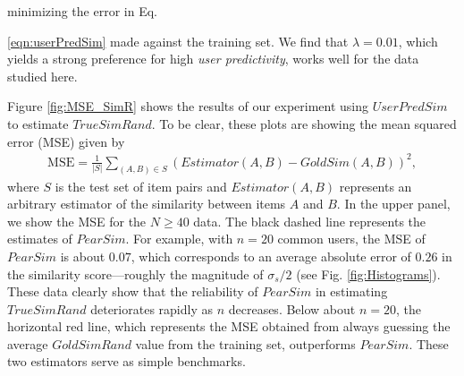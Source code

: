 \documentclass[11pt]{article}
\begin{document}
minimizing the error in Eq. {\ref{eqn:userPredSim} made against the training
set. We find that $\lambda = 0.01$, which yields a strong preference for high
{\em user predictivity}, works well for the data studied here.

Figure \ref{fig:MSE_SimR} shows the results of our experiment using
$UserPredSim$ to estimate $TrueSimRand$. To be clear, these plots are showing
the mean squared error (MSE) given by
\begin{align}
\mathrm{MSE} = \frac{1}{\left|S\right|}\sum_{(A,B) \in S}
{\left(Estimator(A,B) - GoldSim(A,B)\right)^2},
\end{align}
where $S$ is the test set of item pairs and $Estimator(A, B)$ represents an
arbitrary estimator of the similarity between items $A$ and $B$. In the upper
panel, we show the MSE for the $N \geq 40$ data. The black dashed line
represents the estimates of $PearSim$. For example, with $n = 20$ common users,
the MSE of $PearSim$ is about $0.07$, which corresponds to an average absolute
error of $0.26$ in the similarity score---roughly the magnitude of $\sigma_s/2$
(see Fig. \ref{fig:Histograms}). These data clearly show that the reliability of
$PearSim$ in estimating $TrueSimRand$ deteriorates rapidly as $n$ decreases.
Below about $n = 20$, the horizontal red line, which represents the MSE obtained
from always guessing the average $GoldSimRand$ value from the training set,
outperforms $PearSim$. These two estimators serve as simple benchmarks.


}
\end{document}
